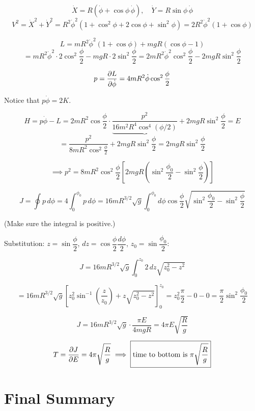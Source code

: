 \[
    \dot{X} = R(\dot{\phi} + \cos\phi\,\dot{\phi}),\quad \dot{Y} = R\sin\phi\,\dot{\phi}
\]
\[
    V^2 = \dot{X}^2 + \dot{Y}^2 = R^2\dot{\phi}^2(1 + \cos^2\phi + 2\cos\phi + \sin^2\phi)
    = 2R^2\dot{\phi}^2(1+\cos\phi)
\]

\[
    L = mR^2\dot{\phi}^2(1+\cos\phi) + mgR(\cos\phi - 1)
\]
\[
    = mR^2\dot{\phi}^2\cdot 2\cos^2\frac{\phi}{2} - mgR\cdot 2\sin^2\frac{\phi}{2}
    = 2mR^2\dot{\phi}^2\cos^2\frac{\phi}{2} - 2mgR\sin^2\frac{\phi}{2}
\]

\[
    p = \pdv{L}{\dot{\phi}} = 4mR^2\dot{\phi}\cos^2\frac{\phi}{2}
\]

Notice that $p\dot{\phi} = 2K$.

\[
    H = p\dot{\phi} - L = 2mR^2\cos\frac{\phi}{2}\cdot\frac{p^2}{\underbrace{16m^2R^4\cos^4(\phi/2)}} + 2mgR\sin^2\frac{\phi}{2} = E
\]
\[
    = \frac{p^2}{8mR^2\cos^2\!\frac{\phi}{2}} + 2mgR\sin^2\frac{\phi}{2} = 2mgR\sin^2\frac{\phi}{2}
\]

\[
    \implies p^2 = 8mR^2\cos^2\frac{\phi}{2}\left[2mgR\!\left(\sin^2\frac{\phi_0}{2} - \sin^2\frac{\phi}{2}\right)\right]
\]

\[
    J = \oint p\,d\phi = 4\int_0^{\phi_0} p\,d\phi
    = 16mR^{3/2}\sqrt{g}\int_0^{\phi_0}d\phi\cos\frac{\phi}{2}\sqrt{\sin^2\frac{\phi_0}{2} - \sin^2\frac{\phi}{2}}
\]

(Make sure the integral is positive.)

Substitution: $z = \sin\dfrac{\phi}{2}$, $dz = \cos\dfrac{\phi}{2}\dfrac{d\phi}{2}$, $z_0 = \sin\dfrac{\phi_0}{2}$:

\[
    J = 16mR^{3/2}\sqrt{g}\int_0^{z_0} 2\,dz\sqrt{z_0^2 - z^2}
\]

\[
    = 16mR^{3/2}\sqrt{g}\left[z_0^2\sin^{-1}\!\left(\frac{z}{z_0}\right) + z\sqrt{z_0^2-z^2}\right]_0^{z_0}
    = z_0^2\frac{\pi}{2} - 0 - 0
    = \frac{\pi}{2}\sin^2\frac{\phi_0}{2}
\]

\[
    J = 16mR^{3/2}\sqrt{g}\cdot\frac{\pi E}{4mgR} = 4\pi E\sqrt{\frac{R}{g}}
\]

\[
    T = \pdv{J}{E} = 4\pi\sqrt{\frac{R}{g}} \implies \boxed{\text{time to bottom is }\pi\sqrt{\frac{R}{g}}}
\]

\chapter{Final Summary}

